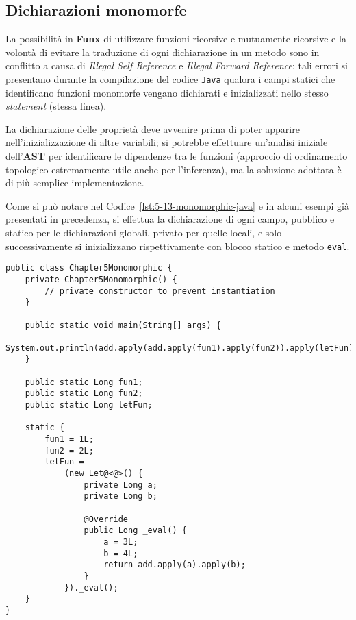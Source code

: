 \subsection{Dichiarazioni monomorfe}
\label{sec:5-13-monomorphic-declarations}

La possibilità in \textbf{Funx} di utilizzare funzioni ricorsive e mutuamente ricorsive
e la volontà di evitare la traduzione di ogni dichiarazione in un metodo sono in conflitto
a causa di \textit{Illegal Self Reference} e \textit{Illegal Forward Reference}:
tali errori si presentano durante la compilazione del codice \texttt{Java}
qualora i campi statici che identificano funzioni monomorfe vengano dichiarati e inizializzati
nello stesso \textit{statement} (stessa linea).


La dichiarazione delle proprietà deve avvenire prima di poter apparire nell'inizializzazione di altre variabili;
si potrebbe effettuare un'analisi iniziale dell'\textbf{AST} per identificare le dipendenze tra le funzioni
(approccio di ordinamento topologico estremamente utile anche per l'inferenza), ma la soluzione adottata
è di più semplice implementazione.

\noindent Come si può notare nel Codice~\ref{lst:5-13-monomorphic-java} e in alcuni esempi già presentati in precedenza,
si effettua la dichiarazione di ogni campo, pubblico e statico per le dichiarazioni globali, privato per quelle locali,
e solo successivamente si inizializzano rispettivamente con blocco statico e metodo \texttt{eval}.

\vspace{4mm}
\begin{lstlisting}[caption={Traduzione di funzioni monomorfe}, style=javaCode, label={lst:5-13-monomorphic-java}]
public class Chapter5Monomorphic {
    private Chapter5Monomorphic() {
        // private constructor to prevent instantiation
    }
    
    public static void main(String[] args) {
        System.out.println(add.apply(add.apply(fun1).apply(fun2)).apply(letFun));
    }
    
    public static Long fun1;    
    public static Long fun2;    
    public static Long letFun;
    
    static {
        fun1 = 1L;    
        fun2 = 2L;    
        letFun =
            (new Let@<@>() {
                private Long a;    
                private Long b;
    
                @Override
                public Long _eval() {
                    a = 3L;
                    b = 4L;
                    return add.apply(a).apply(b);
                }
            })._eval();
    }
}
\end{lstlisting}


